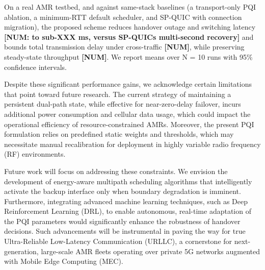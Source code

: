 \documentclass[preprint,11pt]{elsarticle}
\begin{document}
On a real AMR testbed, and against same-stack baselines (a transport-only PQI ablation, a minimum-RTT default scheduler, and SP-QUIC with connection migration), the proposed scheme reduces handover outage and switching latency \textbf{[NUM: to sub-XXX ms, versus SP-QUIC\textquotesingle s multi-second recovery]} and bounds total transmission delay under cross-traffic \textbf{[NUM]}, while preserving steady-state throughput \textbf{[NUM]}. We report means over N = 10 runs with 95\% confidence intervals.

Despite these significant performance gains, we acknowledge certain limitations that point toward future research. The current strategy of maintaining a persistent dual-path state, while effective for near-zero-delay failover, incurs additional power consumption and cellular data usage, which could impact the operational efficiency of resource-constrained AMRs. Moreover, the present PQI formulation relies on predefined static weights and thresholds, which may necessitate manual recalibration for deployment in highly variable radio frequency (RF) environments.

Future work will focus on addressing these constraints. We envision the development of energy-aware multipath scheduling algorithms that intelligently activate the backup interface only when boundary degradation is imminent. Furthermore, integrating advanced machine learning techniques, such as Deep Reinforcement Learning (DRL), to enable autonomous, real-time adaptation of the PQI parameters would significantly enhance the robustness of handover decisions. Such advancements will be instrumental in paving the way for true Ultra-Reliable Low-Latency Communication (URLLC), a cornerstone for next-generation, large-scale AMR fleets operating over private 5G networks augmented with Mobile Edge Computing (MEC).
\end{document}
